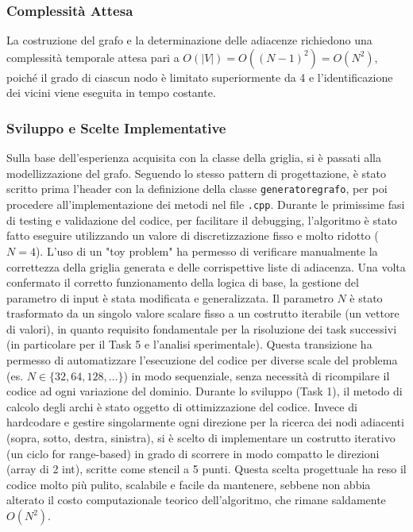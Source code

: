 \documentclass[twocolumn]{article}
\begin{document}
\subsubsection{Complessit\`a Attesa}
La costruzione del grafo e la determinazione delle adiacenze richiedono una complessit\`a temporale attesa pari a $O(|V|) = O((N-1)^2) = O(N^2)$, poich\'e il grado di ciascun nodo \`e limitato superiormente da 4 e l'identificazione dei vicini viene eseguita in tempo costante.

\subsubsection{Sviluppo e Scelte Implementative}
Sulla base dell'esperienza acquisita con la classe della griglia, si è passati alla modellizzazione del grafo. Seguendo lo stesso pattern di progettazione, è stato scritto prima l'header con la definizione della classe \texttt{generatoregrafo}, per poi procedere all'implementazione dei metodi nel file \texttt{.cpp}. 
Durante le primissime fasi di testing e validazione del codice, per facilitare il debugging, l'algoritmo è stato fatto eseguire utilizzando un valore di discretizzazione fisso e molto ridotto ($N=4$). L'uso di un "toy problem" ha permesso di verificare manualmente la correttezza della griglia generata e delle corrispettive liste di adiacenza. 
Una volta confermato il corretto funzionamento della logica di base, la gestione del parametro di input è stata modificata e generalizzata. Il parametro $N$ è stato trasformato da un singolo valore scalare fisso a un costrutto iterabile (un vettore di valori), in quanto requisito fondamentale per la risoluzione dei task successivi 
(in particolare per il Task 5 e l'analisi sperimentale). Questa transizione ha permesso di automatizzare l'esecuzione del codice per diverse scale del problema (es. $N \in \{32, 64, 128, \dots\}$) in modo sequenziale, senza necessità di ricompilare il codice ad ogni variazione del dominio.
Durante lo sviluppo (Task 1), il metodo di calcolo degli archi è stato oggetto di ottimizzazione del codice. Invece di hardcodare e gestire singolarmente ogni direzione per la ricerca dei nodi adiacenti (sopra, sotto, destra, sinistra), si è scelto di implementare un costrutto iterativo (un ciclo for range-based) in grado di scorrere in modo compatto
le direzioni (array di 2 int), scritte come stencil a 5 punti. Questa scelta progettuale ha reso il codice molto più pulito, scalabile e facile da mantenere, sebbene non abbia alterato il costo computazionale teorico dell'algoritmo, che rimane saldamente $O(N^2)$.
\end{document}
